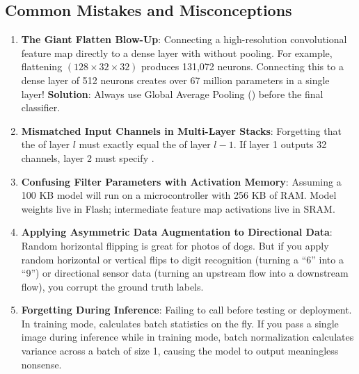 \subsection{Common Mistakes and Misconceptions}\label{subsec:mistakes}

\begin{warning}
\begin{enumerate}
    \item \textbf{The Giant Flatten Blow-Up}: Connecting a high-resolution convolutional feature map directly to a dense layer with  without pooling. For example, flattening $(128 \times 32 \times 32)$ produces 131,072 neurons. Connecting this to a dense layer of 512 neurons creates over 67 million parameters in a single layer! \textbf{Solution}: Always use Global Average Pooling () before the final classifier.
    \item \textbf{Mismatched Input Channels in Multi-Layer Stacks}: Forgetting that the  of layer $l$ must exactly equal the  of layer $l-1$. If layer 1 outputs 32 channels, layer 2 must specify .
    \item \textbf{Confusing Filter Parameters with Activation Memory}: Assuming a 100 KB model will run on a microcontroller with 256 KB of RAM. Model weights live in Flash; intermediate feature map activations live in SRAM.
    \item \textbf{Applying Asymmetric Data Augmentation to Directional Data}: Random horizontal flipping is great for photos of dogs. But if you apply random horizontal or vertical flips to digit recognition (turning a ``6'' into a ``9'') or directional sensor data (turning an upstream flow into a downstream flow), you corrupt the ground truth labels.
    \item \textbf{Forgetting  During Inference}: Failing to call  before testing or deployment. In training mode,  calculates batch statistics on the fly. If you pass a single image during inference while in training mode, batch normalization calculates variance across a batch of size 1, causing the model to output meaningless nonsense.
\end{enumerate}
\end{warning}

